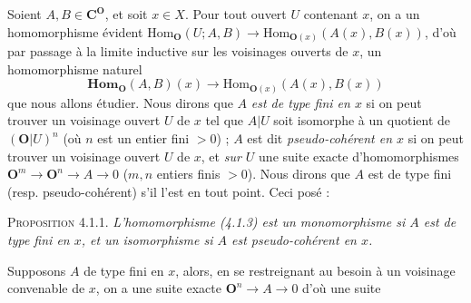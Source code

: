 Soient $A,B\in \mathbf C^\mathbf O$, et soit $x\in X$. Pour tout ouvert $U$ contenant $x$, on
a un homomorphisme évident
$\mathrm{Hom}_\mathbf O(U;A,B)\to\mathrm{Hom}_{\mathbf O(x)}(A(x),B(x))$, d'où par
passage à la limite inductive sur les voisinages ouverts de $x$, un
homomorphisme naturel
\[
\tag{4.1.3}
\mathbf{Hom}_\mathbf O(A,B)(x)\to\mathrm{Hom}_{\mathbf O(x)}(A(x),B(x))
\]
que nous allons étudier.
Nous dirons que $A$ \textit{est de type fini en $x$} si on peut trouver un
voisinage ouvert $U$ de $x$ tel que $A|U$ soit isomorphe à un quotient de
$(\mathbf O|U)^n$ (où $n$ est un entier fini $>0$) ;
$A$ est dit \textit{pseudo-cohérent en $x$} si on peut trouver un voisinage
ouvert $U$ de $x$, et \textit{sur $U$} une suite exacte d'homomorphismes
$\mathbf O^m\to \mathbf O^n\to A\to0$ ($m,n$ entiers
finis $>0$). Nous dirons que $A$ est de type fini (resp. pseudo-cohérent) s'il
l'est en tout point. Ceci posé :

\textsc{Proposition 4.1.1.} \textit{L'homomorphisme \textup{(4.1.3)} est un
monomorphisme si $A$ est de type fini en $x$, et un isomorphisme si $A$ est
pseudo-cohérent en $x$.}

Supposons $A$ de type fini en $x$, alors, en se restreignant au besoin à un
voisinage convenable de $x$, on a une suite exacte
$\mathbf O^n\to A\to0$ d'où une suite

